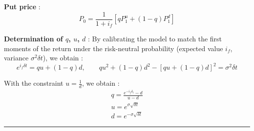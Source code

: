 \begin{f}
\textbf{Put price} :
\[
P_{0} = \frac{1}{1+i_f} \left[ q P_{1}^{u} + (1 - q) P_{1}^{d} \right]
\]

\textbf{Determination of \(q\), \(u\), \(d\)} :  
By calibrating the model to match the first moments of the return under the risk-neutral probability (expected value \(i_f\), variance \(\sigma^2 \delta t\)), we obtain :
\[
e^{i_{f} \delta t} = q u + (1-q) d, \qquad q u^2 + (1-q) d^2 - [q u + (1-q) d]^2 = \sigma^2 \delta t
\]

With the constraint \(u = \frac{1}{d}\), we obtain :
\[
\begin{array}{l}
	q = \frac{e^{-i_f \delta_t} - d}{u - d} \\
	u = e^{\sigma \sqrt{\delta t}} \\
	d = e^{-\sigma \sqrt{\delta t}}
\end{array}
\]

\end{f}
\hrule

